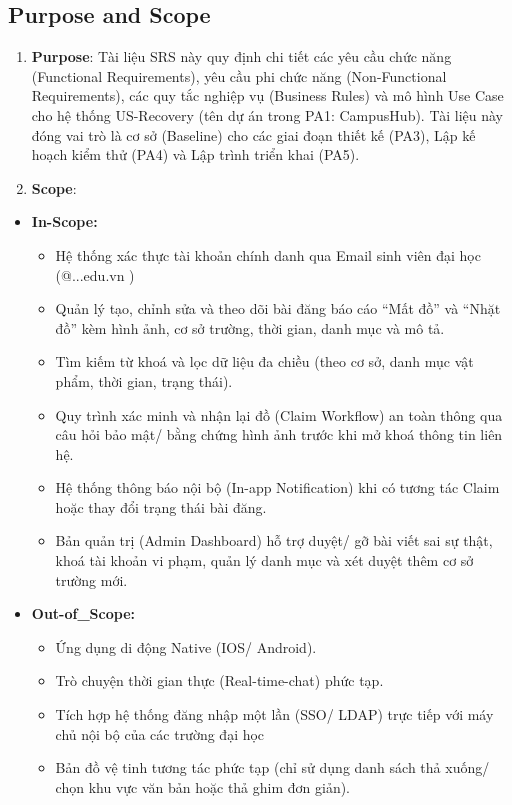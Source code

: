 \subsection{Purpose and Scope}\label{purpose-and-scope}

\begin{enumerate}
\def\labelenumi{\arabic{enumi}.}
\item
  \textbf{Purpose}: Tài liệu SRS này quy định chi tiết các yêu cầu chức
  năng (Functional Requirements), yêu cầu phi chức năng (Non-Functional
  Requirements), các quy tắc nghiệp vụ (Business Rules) và mô hình Use
  Case cho hệ thống US-Recovery (tên dự án trong PA1: CampusHub). Tài
  liệu này đóng vai trò là cơ sở (Baseline) cho các giai đoạn thiết kế
  (PA3), Lập kế hoạch kiểm thử (PA4) và Lập trình triển khai (PA5).
\item
  \textbf{Scope}:
\end{enumerate}

\begin{itemize}
\item
  \textbf{In-Scope:}

  \begin{itemize}
  \item
    Hệ thống xác thực tài khoản chính danh qua Email sinh viên đại học
    (@...edu.vn )
  \item
    Quản lý tạo, chỉnh sửa và theo dõi bài đăng báo cáo ``Mất đồ'' và
    ``Nhặt đồ'' kèm hình ảnh, cơ sở trường, thời gian, danh mục và mô
    tả.
  \item
    Tìm kiếm từ khoá và lọc dữ liệu đa chiều (theo cơ sở, danh mục vật
    phẩm, thời gian, trạng thái).
  \item
    Quy trình xác minh và nhận lại đồ (Claim Workflow) an toàn thông qua
    câu hỏi bảo mật/ bằng chứng hình ảnh trước khi mở khoá thông tin
    liên hệ.
  \item
    Hệ thống thông báo nội bộ (In-app Notification) khi có tương tác
    Claim hoặc thay đổi trạng thái bài đăng.
  \item
    Bản quản trị (Admin Dashboard) hỗ trợ duyệt/ gỡ bài viết sai sự
    thật, khoá tài khoản vi phạm, quản lý danh mục và xét duyệt thêm cơ
    sở trường mới.
  \end{itemize}
\item
  \textbf{Out-of\_Scope:}

  \begin{itemize}
  \item
    Ứng dụng di động Native (IOS/ Android).
  \item
    Trò chuyện thời gian thực (Real-time-chat) phức tạp.
  \item
    Tích hợp hệ thống đăng nhập một lần (SSO/ LDAP) trực tiếp với máy
    chủ nội bộ của các trường đại học
  \item
    Bản đồ vệ tinh tương tác phức tạp (chỉ sử dụng danh sách thả xuống/
    chọn khu vực văn bản hoặc thả ghim đơn giản).
  \end{itemize}
\end{itemize}

